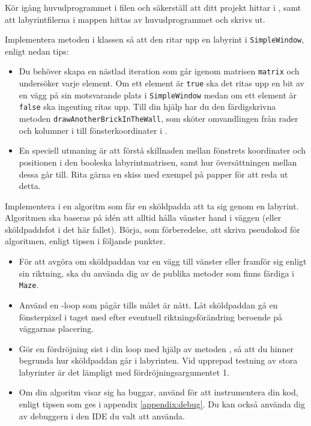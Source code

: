 \Task Kör igång huvudprogrammet i filen  och säkerställ att ditt projekt hittar  i , samt att labyrintfilerna i mappen  hittas av huvudprogrammet och skrivs ut.

\Task Implementera metoden  i klassen  så att den ritar upp en labyrint i \texttt{SimpleWindow}, enligt nedan tips:

\begin{itemize}
\item Du behöver skapa en nästlad iteration som går igenom matrisen \texttt{matrix} och undersöker varje element. Om ett element är \texttt{true} ska det ritas upp en bit av en vägg på sin motsvarande plats i \texttt{SimpleWindow} medan om ett element är \texttt{false} ska ingenting ritas upp.
Till din hjälp har du den färdigskrivna metoden \texttt{drawAnotherBrickInTheWall}, som sköter omvandlingen från rader och kolumner i  till fönsterkoordinater i .

\item En speciell utmaning är att förstå skillnaden mellan fönstrets koordinater och positionen i den booleska labyrintmatrisen, samt hur översättningen mellan dessa går till. Rita gärna en skiss med exempel på papper för att reda ut detta.
\end{itemize}



\Task Implementera i  en algoritm som får en sköldpadda att ta sig genom en labyrint. Algoritmen ska baseras på idén att alltid hålla vänster hand i väggen (eller sköldpaddsfot i det här fallet). Börja, som förberedelse, att skriva pseudokod för algoritmen, enligt tipsen i följande punkter.


\begin{itemize}

\item För att avgöra om sköldpaddan var en vägg till vänster eller framför sig enligt sin riktning, ska du använda dig av de publika metoder som finns färdiga i \texttt{Maze}.

\item Använd en -loop som pågår tills målet är nått. Låt sköldpaddan gå en fönsterpixel i taget med  efter eventuell riktningsförändring beroende på väggarnas placering.

\item Gör en fördröjning sist i din loop med hjälp av metoden , så att du hinner begrunda hur sköldpaddan går i labyrinten. Vid upprepad testning av stora labyrinter är det lämpligt med fördröjningsargumentet 1.

\item Om din algoritm visar sig ha buggar, använd  för att instrumentera din kod, enligt tipsen som ges i appendix \ref{appendix:debug}. Du kan också använda dig av debuggern i den IDE du valt att använda.

\end{itemize}

